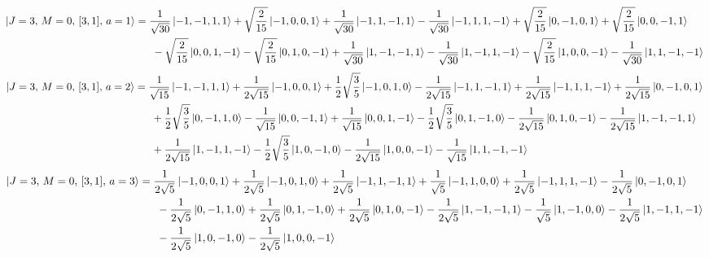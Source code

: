 \documentclass{article}
\begin{document}
{\small
\begin{equation*}
\begin{aligned}
\ket{J=3,\,M=0,\,[3,1],\,a=1} = \; &\frac{1}{\sqrt{30}} \ket{-1,-1,1,1} + \sqrt{\frac{2}{15}} \ket{-1,0,0,1} + \frac{1}{\sqrt{30}} \ket{-1,1,-1,1} - \frac{1}{\sqrt{30}} \ket{-1,1,1,-1} + \sqrt{\frac{2}{15}} \ket{0,-1,0,1} + \sqrt{\frac{2}{15}} \ket{0,0,-1,1} \\
  & \; - \sqrt{\frac{2}{15}} \ket{0,0,1,-1} - \sqrt{\frac{2}{15}} \ket{0,1,0,-1} + \frac{1}{\sqrt{30}} \ket{1,-1,-1,1} - \frac{1}{\sqrt{30}} \ket{1,-1,1,-1} - \sqrt{\frac{2}{15}} \ket{1,0,0,-1} - \frac{1}{\sqrt{30}} \ket{1,1,-1,-1}
\end{aligned}
\end{equation*}}
{\small
\begin{equation*}
\begin{aligned}
\ket{J=3,\,M=0,\,[3,1],\,a=2} = \; &\frac{1}{\sqrt{15}} \ket{-1,-1,1,1} + \frac{1}{2\sqrt{15}} \ket{-1,0,0,1} + \frac{1}{2}\sqrt{\frac{3}{5}} \ket{-1,0,1,0} - \frac{1}{2\sqrt{15}} \ket{-1,1,-1,1} + \frac{1}{2\sqrt{15}} \ket{-1,1,1,-1} + \frac{1}{2\sqrt{15}} \ket{0,-1,0,1} \\
  & \; + \frac{1}{2}\sqrt{\frac{3}{5}} \ket{0,-1,1,0} - \frac{1}{\sqrt{15}} \ket{0,0,-1,1} + \frac{1}{\sqrt{15}} \ket{0,0,1,-1} - \frac{1}{2}\sqrt{\frac{3}{5}} \ket{0,1,-1,0} - \frac{1}{2\sqrt{15}} \ket{0,1,0,-1} - \frac{1}{2\sqrt{15}} \ket{1,-1,-1,1} \\
  & \; + \frac{1}{2\sqrt{15}} \ket{1,-1,1,-1} - \frac{1}{2}\sqrt{\frac{3}{5}} \ket{1,0,-1,0} - \frac{1}{2\sqrt{15}} \ket{1,0,0,-1} - \frac{1}{\sqrt{15}} \ket{1,1,-1,-1}
\end{aligned}
\end{equation*}}
{\small
\begin{equation*}
\begin{aligned}
\ket{J=3,\,M=0,\,[3,1],\,a=3} = \; &\frac{1}{2\sqrt{5}} \ket{-1,0,0,1} + \frac{1}{2\sqrt{5}} \ket{-1,0,1,0} + \frac{1}{2\sqrt{5}} \ket{-1,1,-1,1} + \frac{1}{\sqrt{5}} \ket{-1,1,0,0} + \frac{1}{2\sqrt{5}} \ket{-1,1,1,-1} - \frac{1}{2\sqrt{5}} \ket{0,-1,0,1} \\
  & \; - \frac{1}{2\sqrt{5}} \ket{0,-1,1,0} + \frac{1}{2\sqrt{5}} \ket{0,1,-1,0} + \frac{1}{2\sqrt{5}} \ket{0,1,0,-1} - \frac{1}{2\sqrt{5}} \ket{1,-1,-1,1} - \frac{1}{\sqrt{5}} \ket{1,-1,0,0} - \frac{1}{2\sqrt{5}} \ket{1,-1,1,-1} \\
  & \; - \frac{1}{2\sqrt{5}} \ket{1,0,-1,0} - \frac{1}{2\sqrt{5}} \ket{1,0,0,-1}
\end{aligned}
\end{equation*}}
\end{document}
